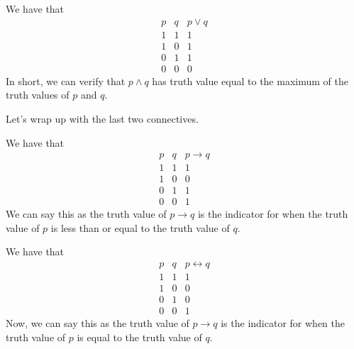 \begin{example}
	We have that
	\[\begin{array}{c|c||c}
		p & q & p\lor q \\\hline
		1 & 1 & 1 \\
		1 & 0 & 1 \\
		0 & 1 & 1 \\
		0 & 0 & 0
	\end{array}\]
	In short, we can verify that $p\land q$ has truth value equal to the maximum of the truth values of $p$ and $q$.
\end{example}
Let's wrap up with the last two connectives.
\begin{example}
	We have that
	\[\begin{array}{c|c||c}
		p & q & p\to q \\\hline
		1 & 1 & 1 \\
		1 & 0 & 0 \\
		0 & 1 & 1 \\
		0 & 0 & 1
	\end{array}\]
	We can say this as the truth value of $p\to q$ is the indicator for when the truth value of $p$ is less than or equal to the truth value of $q$.
\end{example}
\begin{example}
	We have that
	\[\begin{array}{c|c||c}
		p & q & p\leftrightarrow q \\\hline
		1 & 1 & 1 \\
		1 & 0 & 0 \\
		0 & 1 & 0 \\
		0 & 0 & 1
	\end{array}\]
	Now, we can say this as the truth value of $p\to q$ is the indicator for when the truth value of $p$ is equal to the truth value of $q$.
\end{example}

